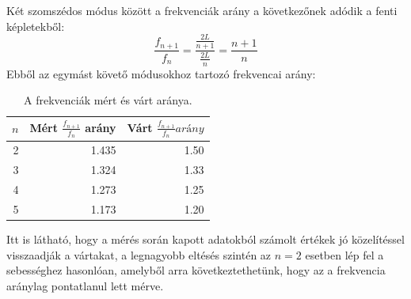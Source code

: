 \documentclass[10pt,pdftex]{report}
\begin{document}
Két szomszédos módus között a frekvenciák arány a következőnek adódik a fenti képletekből:
\begin{equation*}
    \frac{f_{n+1}}{f_{n}}=\frac{\frac{2L}{n+1}}{\frac{2L}{n}}=\frac{n+1}{n}
\end{equation*}
Ebből az egymást követő módusokhoz tartozó frekvencai arány:
\begin{table}[H]
    \centering
    \begin{tabular}{|r|r|r|}
        \hline
        $n$ & Mért $\frac{f_{n+1}}{f_n}$ arány & Várt $\frac{f_{n+1}}{f_n} arány$ \\
        \hline
        2 & 1.435 & 1.50 \\
        \hline
        3 & 1.324 & 1.33 \\
        \hline
        4 & 1.273 & 1.25 \\
        \hline
        5 & 1.173 & 1.20 \\
        \hline
    \end{tabular}
    \caption{A frekvenciák mért és várt aránya.}
\end{table}
Itt is látható, hogy a mérés során kapott adatokból számolt értékek jó közelítéssel visszaadják a vártakat, a legnagyobb eltésés szintén az $n=2$ esetben lép fel a sebességhez hasonlóan, amelyből arra következtethetünk, hogy az a frekvencia aránylag pontatlanul lett mérve.
\end{document}
